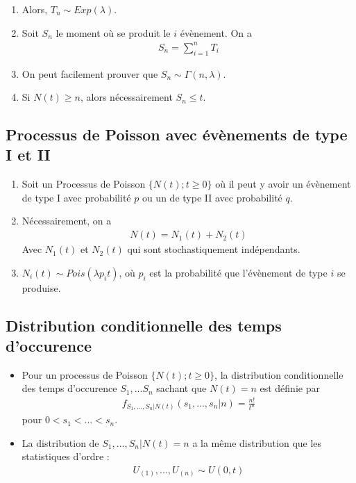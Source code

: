 \documentclass[10pt, french]{article}
\begin{document}
\begin{multicols*}{2}
\begin{enumerate}[label=\faAngleRight]
\item Alors, $T_n \sim Exp (\lambda)$.

\item Soit $S_n$ le moment où se produit le $i$ évènement. On a
\begin{align*}
S_n = \sum_{i=1}^{n} T_i
\end{align*}
\item On peut facilement prouver que $S_n \sim \Gamma(n, \lambda)$.

\item Si $N(t) \geq n$, alors nécessairement $S_n \leq t$.
\end{enumerate}

\subsection*{Processus de Poisson avec évènements de type I et II}
\begin{enumerate}[label=\faAngleRight]
\item Soit un Processus de Poisson $\{N(t) ; t \geq 0 \}$ où il peut y avoir un évènement de type I avec probabilité $p$ ou un de type II avec probabilité $q$.
\item Nécessairement, on a
\begin{align*}
N(t) = N_1(t) + N_2(t)
\end{align*}
Avec $N_1(t)$ et $N_2(t)$ qui sont stochastiquement indépendants.

\item $N_i(t) \sim Pois(\lambda p_i t)$, où $p_i$ est la probabilité que l'évènement de type $i$ se produise.
\end{enumerate}


\subsection*{Distribution conditionnelle des temps d'occurence}
\begin{itemize}
\item Pour un processus de Poisson $\{ N(t) ; t \geq 0 \}$, la distribution conditionnelle des temps d'occurence $S_1, ... S_n$ sachant que $N(t) = n$ est définie par
\begin{align*}
f_{S_1, ..., S_n | N(t)}(s_1, ..., s_n | n) = \frac{n!}{t^n}
\end{align*}
pour $0 < s_1 < ... < s_n$.

\item La distribution de $S_1, ..., S_n | N(t) = n$ a la même distribution que les statistiques d'ordre : 
\begin{align*}
U_{(1)}, ..., U_{(n)} \sim U(0,t)
\end{align*}
\end{itemize}


\end{multicols*}
\end{document}
